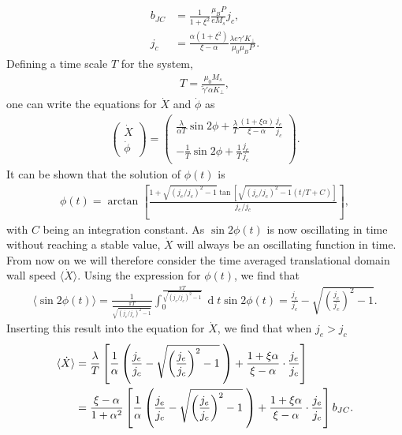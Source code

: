 \documentclass[12pt, a4paper, twoside, openright]{article}		%
\renewcommand{\d}[1]{\ensuremath{\operatorname{d}\!{#1}}}
\numberwithin{equation}{section}
\begin{document}
\begin{align}
b_{JC} &= \frac{1}{1+\xi^2}\frac{\mu_B P}{e M_s} j_c, \\
j_c &= \frac{\alpha(1+\xi^2)}{\xi-\alpha}\frac{\lambda e \gamma ' K_{\perp}}{\mu_0\mu_B P}. \label{eq:critical_current}
\end{align}
Defining a time scale $T$ for the system,
\begin{align}
T = \frac{\mu_0 M_s}{\tilde{\gamma}' \alpha K_{\perp}},
\end{align}
one can write the equations for $\dot{X}$ and $\dot{\phi}$ as
\begin{align}
\label{eq:xdot_phidot_v2}
\begin{pmatrix}
\dot{X} \\ \dot{\phi}
\end{pmatrix}
=
\begin{pmatrix}
\frac{\lambda}{\alpha T} \sin2\phi + \frac{\lambda}{T}\frac{(1+\xi\alpha)}{\xi - \alpha} \frac{j_e}{j_c} \\
-\frac{1}{T}  \sin2\phi + \frac{1}{T}\frac{j_e}{j_c}
\end{pmatrix}.
\end{align}
It can be shown that the solution of $\phi(t)$ is
\begin{align}
\phi(t) = \arctan\left[\frac{1+\sqrt{(j_e/j_c)^2-1}\tan\left[\sqrt{(j_e/j_c)^2-1}(t/T+C)\right]}{j_e/j_c}\right],
\end{align}
with $C$ being an integration constant. As $\sin2\phi(t)$ is now oscillating in time without reaching a stable value, $\dot{X}$ will always be an oscillating function in time. From now on we will therefore consider the time averaged translational domain wall speed $\langle \dot{X} \rangle$. Using the expression for $\phi(t)$, we find that
\begin{align}
\langle\sin2\phi(t)\rangle = \frac{1}{\frac{\pi T}{\sqrt{(j_e/j_c)^2-1}}} \int_0^{\frac{\pi T}{\sqrt{(j_e/j_c)^2-1}}} \d t \sin2\phi(t) = \frac{j_e}{j_c}-\sqrt{\left(\frac{j_e}{j_c}\right)^2-1}.
\end{align}
Inserting this result into the equation for $\dot{X}$, we find that when $j_e > j_c$
\begin{align}
\label{eq:xdot_av_abovecrit}
\nonumber \langle\dot{X}\rangle &= \frac{\lambda}{T}\left[\frac{1}{\alpha}\left(\frac{j_e}{j_c}-\sqrt{\left(\frac{j_e}{j_c}\right)^2-1}\hspace{1mm}\right) + \frac{1+\xi\alpha}{\xi-\alpha}\cdot\frac{j_e}{j_c}\right] \\
&= \frac{\xi-\alpha}{1+\alpha^2} \left[\frac{1}{\alpha}\left(\frac{j_e}{j_c}-\sqrt{\left(\frac{j_e}{j_c}\right)^2-1}\hspace{1mm}\right) + \frac{1+\xi\alpha}{\xi-\alpha}\cdot\frac{j_e}{j_c}\right] b_{JC}.
\end{align}
\end{document}
